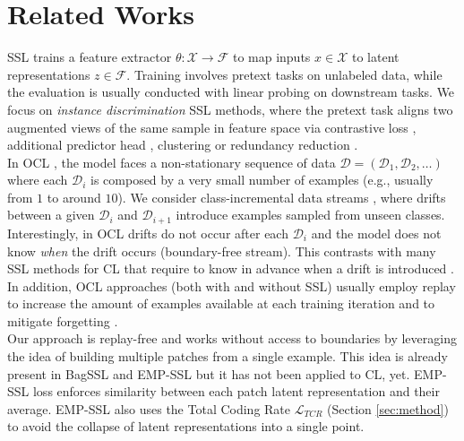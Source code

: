 \section{Related Works}
SSL trains a feature extractor $\theta: \mathcal{X} \rightarrow \mathcal{F}$ to map inputs \(x \in \mathcal{X}\) to latent representations \(z \in \mathcal{F}\). Training involves pretext tasks on unlabeled data, while the evaluation is usually conducted with linear probing on downstream tasks.
We focus on \textit{instance discrimination} SSL methods, where the pretext task aligns two augmented views of the same sample in feature space via contrastive loss \cite{chen2020simclr}, additional predictor head \cite{chen2020simsiam}, clustering \cite{caron2021swav} or redundancy reduction \cite{bardes2022vicreg}.\\
In OCL \cite{soutifcormerais2023comprehensive}, the model faces a non-stationary sequence of data $\mathcal{D} = (\mathcal{D}_1, \mathcal{D}_2, \ldots)$ where each $\mathcal{D}_i$ is composed by a very small number of examples (e.g., usually from $1$ to around $10$). We consider class-incremental data streams \cite{rebuffi2017icarl}, where drifts between a given $\mathcal{D}_i$ and $\mathcal{D}_{i+1}$ introduce examples sampled from unseen classes. Interestingly, in OCL drifts do not occur after each $\mathcal{D}_i$ and the model does not know \emph{when} the drift occurs (boundary-free stream). This contrasts with many SSL methods for CL that require to know in advance when a drift is introduced \cite{gomezvilla2022pfr}. In addition, OCL approaches (both with and without SSL) usually employ replay to increase the amount of examples available at each training iteration and to mitigate forgetting \cite{purushwalkam2022minred, soutifcormerais2023comprehensive, yu2023scale, purushwalkam2022minred}.\\
Our approach is replay-free and works without access to boundaries by leveraging the idea of building multiple patches from a single example. This idea is already present in BagSSL \cite{chen2022bagssl} and EMP-SSL \cite{tong2023emp} but it has not been applied to CL, yet.
EMP-SSL loss enforces similarity between each patch latent representation and their average. EMP-SSL also uses the Total Coding Rate $\mathcal{L}_\textit{TCR}$ (Section \ref{sec:method}) to avoid the collapse of latent representations into a single point.

